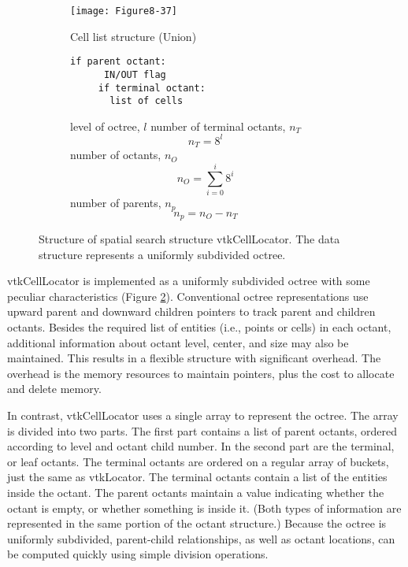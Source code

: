 \begin{figure}[!htb]
    \centering
    \begin{subfigure}{0.48\linewidth}
        \centering
        \texttt{[image: Figure8-37]}
        \caption*{}\label{fig:Figure8-37a}
    \end{subfigure}
    \hfill
    \begin{subfigure}{0.48\linewidth}
    Cell list structure (Union)
    \begin{lstlisting}[caption={}, numbers=none, frame=none]
    if parent octant:
      IN/OUT flag
     if terminal octant:
       list of cells
    \end{lstlisting}
    level of octree, $l$
    number of terminal octants, $n_T$
    \begin{equation*}
        n_T = 8^l
    \end{equation*}
    number of octants, $n_O$
    \begin{equation*}
        n_O = \sum_{i = 0}^i 8^i
    \end{equation*}
    number of parents, $n_p$
    \begin{equation*}
        n_p = n_O - n_T
    \end{equation*}
    \end{subfigure}%
    \caption{ Structure of spatial search structure vtkCellLocator. The data structure represents a uniformly subdivided octree.}
    \label{fig:Figure8-37}
\end{figure}

vtkCellLocator is implemented as a uniformly subdivided octree with some peculiar characteristics (Figure \ref{fig:Figure8-37}). Conventional octree representations use upward parent and downward children pointers to track parent and children octants. Besides the required list of entities (i.e., points or cells) in each octant, additional information about octant level, center, and size may also be maintained. This results in a flexible structure with significant overhead. The overhead is the memory resources to maintain pointers, plus the cost to allocate and delete memory.

In contrast, vtkCellLocator uses a single array to represent the octree. The array is divided into two parts. The first part contains a list of parent octants, ordered according to level and octant child number. In the second part are the terminal, or leaf octants. The terminal octants are ordered on a regular array of buckets, just the same as vtkLocator. The terminal octants contain a list of the entities inside the octant. The parent octants maintain a value indicating whether the octant is empty, or whether something is inside it. (Both types of information are represented in the same portion of the octant structure.) Because the octree is uniformly subdivided, parent-child relationships, as well as octant locations, can be computed quickly using simple division operations.

